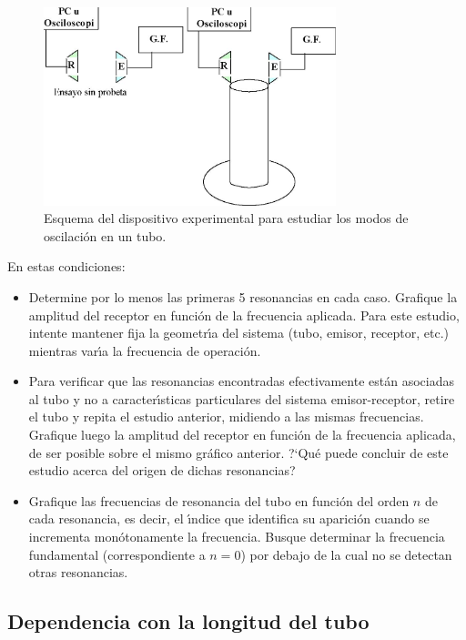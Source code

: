 \documentclass[laboratorio]{guia}
\begin{document}
\begin{figure}[t!]
    \centering
    \includegraphics[width=8.5cm]{LG08--000.png}
    \caption{Esquema del dispositivo experimental para estudiar los modos de
    oscilaci\'on en un tubo.}
    \label{fig:1}
\end{figure}




En estas condiciones:
\begin{itemize}
    \item Determine por lo menos las primeras 5 resonancias en cada caso.
        Grafique la amplitud del receptor en funci\'on de la frecuencia
        aplicada. Para este estudio, intente mantener fija la geometr\'\i a del
        sistema (tubo, emisor, receptor, etc.) mientras var\'\i a la frecuencia
        de operaci\'on.
    \item Para verificar que las resonancias encontradas efectivamente est\'an
        asociadas al tubo y no a caracter\'\i sticas particulares del sistema
        emisor-receptor, retire el tubo y repita el estudio anterior, midiendo
        a las mismas frecuencias. Grafique luego la amplitud del receptor en
        funci\'on de la frecuencia aplicada, de ser posible sobre el mismo
        gr\'afico anterior. ?`Qu\'e puede concluir de este estudio acerca del
        origen de dichas resonancias?
    \item Grafique las frecuencias de resonancia del tubo en funci\'on del
        orden $n$ de cada resonancia, es decir, el \'\i ndice que identifica su
        aparici\'on cuando se incrementa mon\'otonamente la frecuencia. Busque
        determinar la frecuencia fundamental (correspondiente a $n=0$) por
        debajo de la cual no se detectan otras resonancias.
\end{itemize}


\subsection{Dependencia con la longitud del tubo}
\end{document}
